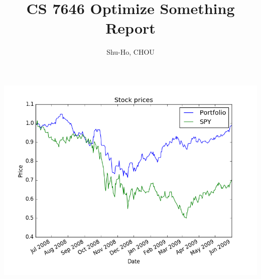 \documentclass[a4paper]{article}
\title{CS 7646 Optimize Something Report}
\author{Shu-Ho, CHOU}
\begin{document}
\maketitle
%

\includegraphics{optimize_0806_0906.png}
\end{document}
